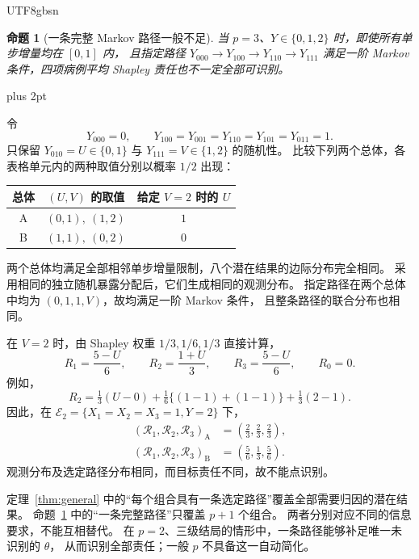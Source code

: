\documentclass[11pt,a4paper]{article}
\makeatletter
\newcommand{\headingweight}{\ifPDFTeX\mdseries\else\bfseries\fi}
\theoremstyle{report}
\newtheorem{proposition}{命题}
\renewenvironment{proof}[1][证明]{\par\pushQED{\qed}\normalfont
  \topsep=6pt plus 2pt\relax\trivlist
  \item[\hskip\labelsep{\headingweight #1。}]\ignorespaces}
  {\popQED\endtrivlist\@endpefalse}
\makeatother
\begin{document}
\begin{CJK*}{UTF8}{gbsn}
\begin{proposition}[一条完整 Markov 路径一般不足]\label{prop:one-path}
当 $p=3$、$Y\in\{0,1,2\}$ 时，即使所有单步增量均在 $[0,1]$ 内，
且指定路径
$Y_{000}\longrightarrow Y_{100}\longrightarrow Y_{110}\longrightarrow Y_{111}$
满足一阶 Markov 条件，四项病例平均 Shapley 责任也不一定全部可识别。
\end{proposition}
\begin{proof}
令
\[
Y_{000}=0,\qquad
Y_{100}=Y_{001}=Y_{110}=Y_{101}=Y_{011}=1.
\]
只保留 $Y_{010}=U\in\{0,1\}$ 与 $Y_{111}=V\in\{1,2\}$ 的随机性。
比较下列两个总体，各表格单元内的两种取值分别以概率 $1/2$ 出现：
\begin{center}
\renewcommand{\arraystretch}{1.25}
\begin{tabular}{@{}ccc@{}}
\toprule
总体 & $(U,V)$ 的取值 & 给定 $V=2$ 时的 $U$\\
\midrule
A & $(0,1),\ (1,2)$ & $1$\\
B & $(1,1),\ (0,2)$ & $0$\\
\bottomrule
\end{tabular}
\end{center}
两个总体均满足全部相邻单步增量限制，八个潜在结果的边际分布完全相同。
采用相同的独立随机暴露分配后，它们生成相同的观测分布。
指定路径在两个总体中均为 $(0,1,1,V)$，故均满足一阶 Markov 条件，
且整条路径的联合分布也相同。

在 $V=2$ 时，由 Shapley 权重 $1/3,1/6,1/3$ 直接计算，
\[
R_1=\frac{5-U}{6},\qquad
R_2=\frac{1+U}{3},\qquad
R_3=\frac{5-U}{6},\qquad R_0=0.
\]
例如，
\[
R_2=\tfrac13(U-0)+\tfrac16\{(1-1)+(1-1)\}+\tfrac13(2-1).
\]
因此，在 $\mathcal E_2=\{X_1=X_2=X_3=1,Y=2\}$ 下，
\[
\begin{aligned}
(\mathcal R_1,\mathcal R_2,\mathcal R_3)_{\mathrm A}
 &=\left(\tfrac23,\tfrac23,\tfrac23\right),\\
(\mathcal R_1,\mathcal R_2,\mathcal R_3)_{\mathrm B}
 &=\left(\tfrac56,\tfrac13,\tfrac56\right).
\end{aligned}
\]
观测分布及选定路径分布相同，而目标责任不同，故不能点识别。
\end{proof}

定理~\ref{thm:general} 中的“每个组合具有一条选定路径”覆盖全部需要归因的潜在结果。
命题~\ref{prop:one-path} 中的“一条完整路径”只覆盖 $p+1$ 个组合。
两者分别对应不同的信息要求，不能互相替代。
在 $p=2$、三级结局的情形中，一条路径能够补足唯一未识别的 $\theta$，
从而识别全部责任；一般 $p$ 不具备这一自动简化。

\ifPDFTeX\end{CJK*}\fi
\end{document}
